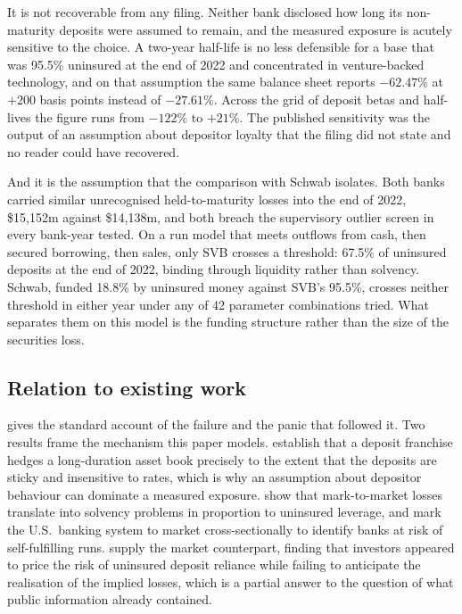 It is not recoverable from any filing. Neither bank disclosed how long its
non-maturity deposits were assumed to remain, and the measured exposure is acutely
sensitive to the choice. A two-year half-life is no less defensible for a base that
was 95.5\% uninsured at the end of 2022 and concentrated in venture-backed
technology, and on that assumption the same balance sheet reports $-62.47\%$ at $+200$ basis points
instead of $-27.61\%$. Across the grid of deposit betas and half-lives the figure runs
from $-122\%$ to $+21\%$. The published sensitivity was the output of an assumption
about depositor loyalty that the filing did not state and no reader could have
recovered.

And it is the assumption that the comparison with Schwab isolates. Both banks carried
similar unrecognised held-to-maturity losses into the end of 2022, \$15,152m against
\$14,138m, and both breach the supervisory outlier screen in every bank-year tested.
On a run model that meets outflows from cash, then secured borrowing, then sales, only
SVB crosses a threshold: 67.5\% of uninsured deposits at the end of 2022, binding
through liquidity rather than solvency. Schwab, funded 18.8\% by uninsured money
against SVB's 95.5\%, crosses neither threshold in either year under any of 42
parameter combinations tried. What separates them on this model is the funding
structure rather than the size of the securities loss.

\subsection{Relation to existing work}

\citet{Metrick2024} gives the standard account of the failure and the panic that
followed it. Two results frame the mechanism this paper models.
\citet{Drechsler2021} establish that a deposit franchise hedges a long-duration asset
book precisely to the extent that the deposits are sticky and insensitive to rates,
which is why an assumption about depositor behaviour can dominate a measured
exposure. \citet{Jiang2024} show that mark-to-market losses translate into solvency
problems in proportion to uninsured leverage, and mark the U.S.\ banking system to
market cross-sectionally to identify banks at risk of self-fulfilling runs.
\citet{Choi2023} supply the market counterpart, finding that investors appeared to
price the risk of uninsured deposit reliance while failing to anticipate the
realisation of the implied losses, which is a partial answer to the question of what
public information already contained.

